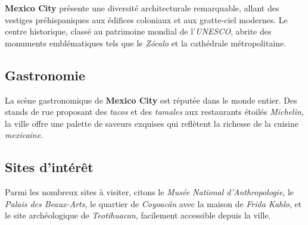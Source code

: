 \documentclass[12pt, a4paper]{article}
\begin{document}
\textbf{Mexico City} présente une diversité architecturale remarquable, allant des vestiges préhispaniques aux édifices coloniaux et aux gratte-ciel modernes. Le centre historique, classé au patrimoine mondial de l'\textit{UNESCO}, abrite des monuments emblématiques tels que le \textit{Zócalo} et la cathédrale métropolitaine.

\subsection*{\textbf{Gastronomie}}

La scène gastronomique de \textbf{Mexico City} est réputée dans le monde entier. Des stands de rue proposant des \textit{tacos} et des \textit{tamales} aux restaurants étoilés \textit{Michelin}, la ville offre une palette de saveurs exquises qui reflètent la richesse de la cuisine \textit{mexicaine}.

\subsection*{\textbf{Sites d'intérêt}}

Parmi les nombreux sites à visiter, citons le \textit{Musée National d'Anthropologie}, le \textit{Palais des Beaux-Arts}, le quartier de \textit{Coyoacán} avec la maison de \textit{Frida Kahlo}, et le site archéologique de \textit{Teotihuacan}, facilement accessible depuis la ville.
\end{document}
